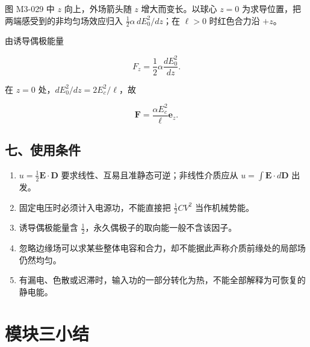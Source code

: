 图 M3-029 中 \(z\) 向上，外场箭头随 \(z\) 增大而变长。以球心 \(z=0\)
为求导位置，把两端感受到的非均匀场效应归入
\(\tfrac12\alpha\,dE_0^2/dz\)；在 \(\ell>0\) 时红色合力沿 \(+z\)。

由诱导偶极能量

\[
F_z=\frac12\alpha\frac{dE_0^2}{dz}.
\]

在 \(z=0\) 处，\(dE_0^2/dz=2E_c^2/\ell\)，故

\[
\boxed{\mathbf F=\frac{\alpha E_c^2}{\ell}\mathbf e_z}.
\]

\subsection{七、使用条件}\label{m3:ux4e03ux4f7fux7528ux6761ux4ef6}

\begin{enumerate}
\def\labelenumi{\arabic{enumi}.}
\tightlist
\item
  \(u=\tfrac12\mathbf E\cdot\mathbf D\)
  要求线性、互易且准静态可逆；非线性介质应从
  \(u=\int\mathbf E\cdot d\mathbf D\) 出发。
\item
  固定电压时必须计入电源功，不能直接把 \(\tfrac12CV^2\) 当作机械势能。
\item
  诱导偶极能量含 \(\tfrac12\)，永久偶极子的取向能一般不含该因子。
\item
  忽略边缘场可以求某些整体电容和合力，却不能据此声称介质前缘处的局部场仍然均匀。
\item
  有漏电、色散或迟滞时，输入功的一部分转化为热，不能全部解释为可恢复的静电能。
\end{enumerate}

\section{模块三小结}\label{m3:ux6a21ux5757ux4e09ux5c0fux7ed3}

